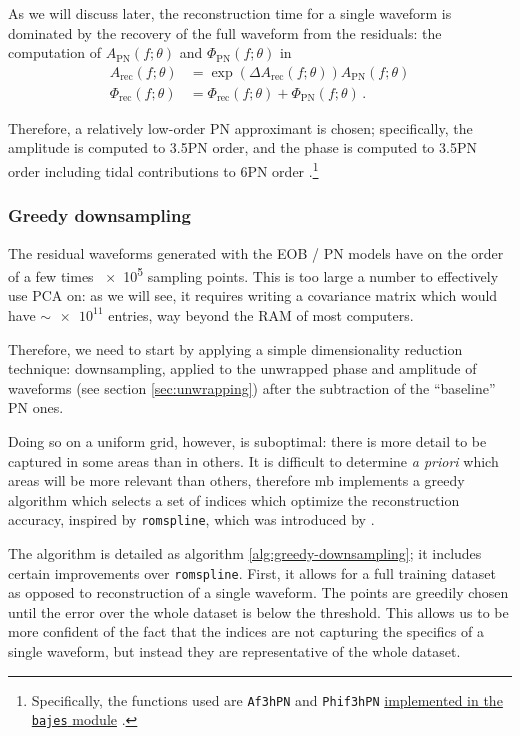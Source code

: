\documentclass[main.tex]{subfiles}
\begin{document}
As we will discuss later, the reconstruction time for a single waveform 
is dominated by the recovery of the full waveform from the residuals: the computation of \(A _{\text{PN}}(f; \theta )\) and \(\Phi _{\text{PN}}(f; \theta )\) in
%
\begin{align}\label{eq:amplitude-phase-reconstruction}
A _{\text{rec}} (f; \theta ) &= \exp( \Delta A _{\text{rec}} (f; \theta )) A _{\text{PN}}(f; \theta )  \\
\Phi _{\text{rec}} (f; \theta ) &= \Phi _{\text{rec}}(f; \theta ) + \Phi _{\text{PN}}(f; \theta )
\,.
\end{align}

Therefore, a relatively low-order \ac{PN} approximant is chosen; specifically, the amplitude is computed to 3.5PN order, and the phase is computed to 3.5PN order including tidal contributions to 6PN order \cite{favataSystematicParameterErrors2014}.\footnote{Specifically, the functions used are \texttt{Af3hPN} and \texttt{Phif3hPN} \href{https://github.com/matteobreschi/bajes/blob/stable/v0.1/bajes/obs/gw/approx/taylorf2.py}{implemented in the \texttt{bajes} module} \cite[]{breschiTtBajesBayesian2021}.}

\subsubsection{Greedy downsampling}

The residual waveforms generated with the \ac{EOB} / \ac{PN} models have on the order of a few times \num{e5} sampling points. 
This is too large a number to effectively use \ac{PCA} on: as we will see, it requires writing a covariance matrix which would have \(\sim \num{e11}\) entries, way beyond the RAM of most computers. 

Therefore, we need to start by applying a simple dimensionality reduction technique: downsampling, applied to the unwrapped phase and amplitude of waveforms (see section \ref{sec:unwrapping}) after the subtraction of the ``baseline'' \ac{PN} ones.

Doing so on a uniform grid, however, is suboptimal: there is more detail to be captured in some areas than in others. 
It is difficult to determine \emph{a priori} which areas will be more relevant than others, therefore \ac{mb} implements a greedy algorithm which selects a set of indices which optimize the reconstruction accuracy, inspired by \texttt{romspline}, which was introduced by
\textcite{galleyFastEfficientEvaluation2016}.

The algorithm is detailed as algorithm \ref{alg:greedy-downsampling}; it includes certain improvements over \texttt{romspline}. 
First, it allows for a full training dataset as opposed to reconstruction of a single waveform. The points are greedily chosen until the error over the whole dataset is below the threshold.
This allows us to be more confident of the fact that the indices are not capturing the specifics of a single waveform, but instead they are representative of the whole dataset.
\end{document}
